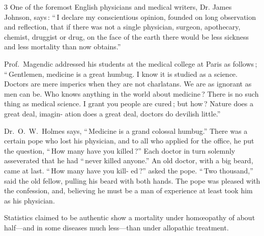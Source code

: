 \documentclass[10pt]{article}
\begin{document}
\begin{multicols}{3}
	One of the foremost English physicians and medical writers, Dr.\linebreak
	James Johnson, says\,: ``\,I declare my conscientious opinion,
	founded on\linebreak
	long observation and reflection, that if there was not a single
	physician,\linebreak
	surgeon, apothecary, chemist, druggist or drug, on the face of the
	earth\linebreak
	there would be less sickness and less mortality than now obtains.''

	Prof.~Magendic addressed his students at the medical college at Paris\linebreak
	as follows\,; ``\,Gentlemen, medicine is a great humbug. I know it is\linebreak
	studied as a science. Doctors are mere imperics when they are not\linebreak
	charlatans. We are as ignorant as men can be. Who knows anything in\linebreak
	the world about medicine\,? There is no such thing as medical
	science. I\linebreak
	grant you people are cured\,; but how\,? Nature does a great deal,
	imagin-\linebreak
	ation does a great deal, doctors do devilish little.''

	Dr.~O.~W.~Holmes says, ``\,Medicine is a grand colossal humbug.''\linebreak
	There was a certain pope who lost his physician, and to all who
	applied for\linebreak
	the office, he put the question, ``\,How many have you killed\,?''
	Each\linebreak
	doctor in turn solemnly asseverated that he had ``\,never killed
	anyone.''\linebreak
	An old doctor, with a big beard, came at last. ``\,How many have you
	kill-\linebreak
	ed\,?'' asked the pope. ``\,Two thousand,'' said the old fellow,
	pulling his\linebreak
	beard with both hands. The pope was pleased with the confession, and,\linebreak
	believing he must be a man of experience at least took him as his physician.

	Statistics claimed to be authentic show a mortality under
	hom{\oe}opathy\linebreak
	of about half---and in some diseases much less---than under
	allopathic\linebreak
	treatment.


\end{multicols}
\end{document}
